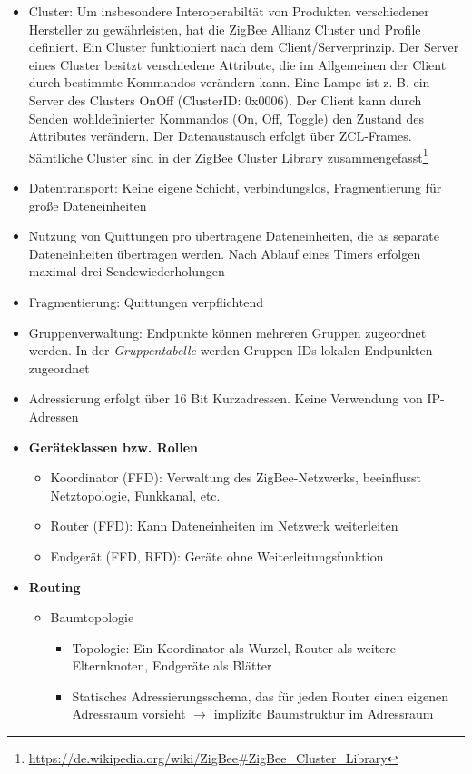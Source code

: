 \begin{itemize}
\begin{itemize}
		\item Cluster: Um insbesondere Interoperabiltät von Produkten verschiedener Hersteller zu gewährleisten, hat die ZigBee Allianz Cluster und Profile definiert. Ein Cluster funktioniert nach dem Client/Serverprinzip. Der Server eines Cluster besitzt verschiedene Attribute, die im Allgemeinen der Client durch bestimmte Kommandos verändern kann. Eine Lampe ist z. B. ein Server des Clusters OnOff (ClusterID: 0x0006). Der Client kann durch Senden wohldefinierter Kommandos (On, Off, Toggle) den Zustand des Attributes verändern. Der Datenaustausch erfolgt über ZCL-Frames. Sämtliche Cluster sind in der ZigBee Cluster Library zusammengefasst\footnote{\url{https://de.wikipedia.org/wiki/ZigBee\#ZigBee_Cluster_Library}}
		\item Datentransport: Keine eigene Schicht, verbindungslos, Fragmentierung für große Dateneinheiten
		\item Nutzung von Quittungen pro übertragene Dateneinheiten, die as separate Dateneinheiten übertragen werden. Nach Ablauf eines Timers erfolgen maximal drei Sendewiederholungen
		\item Fragmentierung: Quittungen verpflichtend
		\item Gruppenverwaltung: Endpunkte können mehreren Gruppen zugeordnet werden. In der \textit{Gruppentabelle} werden Gruppen IDs lokalen Endpunkten zugeordnet
		\item Adressierung erfolgt über 16 Bit Kurzadressen. Keine Verwendung von IP-Adressen
		\item \textbf{Geräteklassen bzw. Rollen}
		\begin{itemize}
			\item Koordinator (FFD): Verwaltung des ZigBee-Netzwerks, beeinflusst Netztopologie, Funkkanal, etc.
			\item Router (FFD): Kann Dateneinheiten im Netzwerk weiterleiten
			\item Endgerät (FFD, RFD): Geräte ohne Weiterleitungsfunktion
		\end{itemize}
		\item \textbf{Routing}
		\begin{itemize}
			\item Baumtopologie
			\begin{itemize}
				\item Topologie: Ein Koordinator als Wurzel, Router als weitere Elternknoten, Endgeräte als Blätter
				\item Statisches Adressierungsschema, das für jeden Router einen eigenen Adressraum vorsieht \(\rightarrow\) implizite Baumstruktur im Adressraum

\end{itemize}
\end{itemize}
\end{itemize}
\end{itemize}
